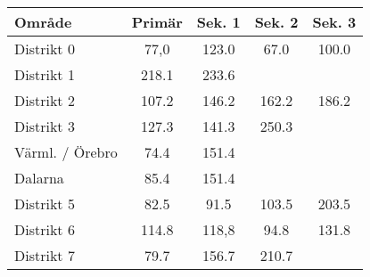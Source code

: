 \begin{longtable}{lcccc}
	\textbf{Område} & \textbf{Primär} & \textbf{Sek. 1} & \textbf{Sek. 2} & \textbf{Sek. 3} \\ \hline
	Distrikt 0      &      77,0       &      123.0      &      67.0       &      100.0      \\
	Distrikt 1      &      218.1      &      233.6      &                 &  \\
	Distrikt 2      &      107.2      &      146.2      &      162.2      &      186.2      \\
	Distrikt 3      &      127.3      &      141.3      &      250.3      &  \\
	Värml. / Örebro &      74.4       &      151.4      &                 &  \\
	Dalarna         &      85.4       &      151.4      &                 &  \\
	Distrikt 5      &      82.5       &      91.5       &      103.5      &      203.5      \\
	Distrikt 6      &      114.8      &      118,8      &      94.8       &      131.8      \\
	Distrikt 7      &      79.7       &      156.7      &      210.7      &
\end{longtable}

